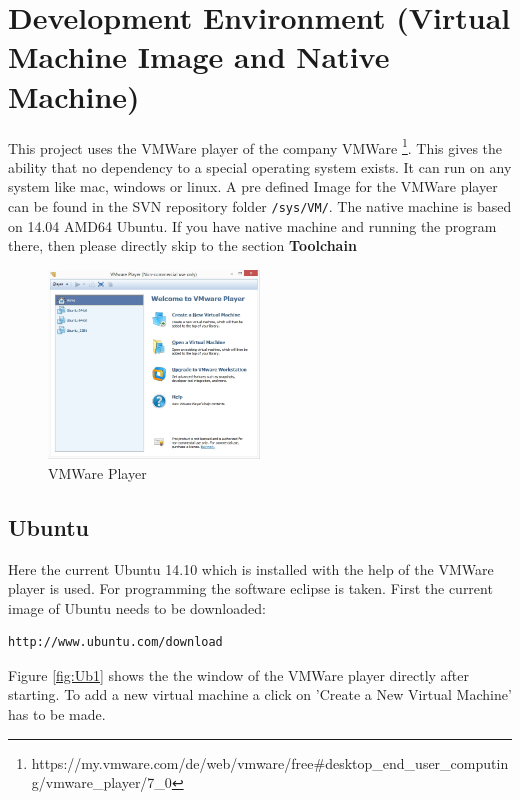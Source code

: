 \chapter{Development Environment (Virtual Machine Image and Native Machine)}
\label{sec:sec-VM}

This project uses the VMWare player of the company VMWare \footnote{https://my.vmware.com/de/web/vmware/free\#desktop\_end\_user\_computing/vmware\_player/7\_0}. This gives the ability that no dependency to a special operating system exists. It can run on any system like mac, windows or linux. A pre defined Image for the VMWare player can be found in the SVN repository folder \texttt{/sys/VM/}.
The native machine is based on 14.04 AMD64 Ubuntu.
If you have native machine and running the program there, then please directly skip to 
the section \textbf{Toolchain}

\begin{figure}[H]
	\centering\includegraphics[width=0.5\textwidth]{fig/Dev_Concept/VMPlayer.jpg}
	\caption{VMWare Player}
	\label{fig:VMPlayer}
\end{figure}

\section{Ubuntu}
\label{subsec:sec-Ub}

Here the current Ubuntu 14.10 which is installed with the help of the VMWare player is used. For programming the software eclipse is taken. First the current image of Ubuntu needs to be downloaded:
\begin{lstlisting}
http://www.ubuntu.com/download
\end{lstlisting}
Figure \ref{fig:Ub1} shows the the window of the VMWare player directly after starting. To add a new virtual machine a click on 'Create a New Virtual Machine' has to be made.

